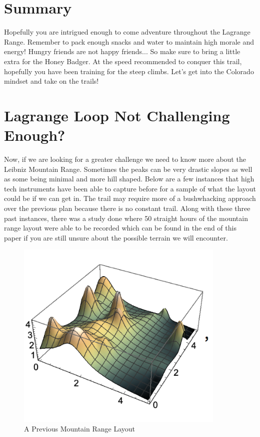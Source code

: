 \documentclass[12pt]{article}   %
\theoremstyle{definition}
\numberwithin{equation}{section}
\begin{document}
\section{Summary} \label{APPM2350proj02sec06}

\quad Hopefully you are intrigued enough to come adventure throughout the Lagrange Range. Remember to pack enough snacks and water to maintain high morale and energy! Hungry friends are not happy friends... So make sure to bring a little extra for the Honey Badger. At the speed recommended to conquer this trail, hopefully you have been training for the steep climbs. Let's get into the Colorado mindset and take on the trails!

\section{Lagrange Loop Not Challenging Enough?} \label{APPM2350proj02sec07}

\quad  Now, if we are looking for a greater challenge we need to know more about the Leibniz Mountain Range. Sometimes the peaks can be very drastic slopes as well as some being minimal and more hill shaped. Below are a few instances that high tech instruments have been able to capture before for a sample of what the layout could be if we can get in. The trail may require more of a bushwhacking approach over the previous plan because there is no constant trail. Along with these three past instances, there was a study done where 50 straight hours of the mountain range layout were able to be recorded which can be found in the end of this paper if you are still unsure about the possible terrain we will encounter.

\begin{figure} [h]
  \centering
  \includegraphics[width=10cm]{../images/mtn1.png}
  \caption{A Previous Mountain Range Layout}
\end{figure}
\end{document}
